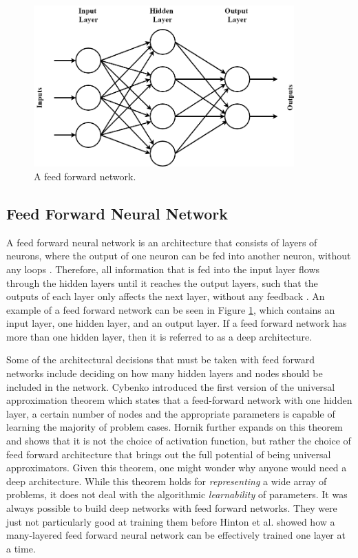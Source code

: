 \documentclass{UoYCSproject}
\begin{document}
\begin{figure}[h]
\includegraphics[width=10cm]{feedforward.png}
\centering
\caption{A feed forward network.} 
\label{fig:feedforward}
\end{figure}

\subsection{Feed Forward Neural Network}
A feed forward neural network is an architecture that consists of layers of neurons, where the output of one neuron can be fed into another neuron, without any loops \cite{jain1996artificial}. Therefore, all information that is fed into the input layer flows through the hidden layers until it reaches the output layers, such that the outputs of each layer only affects the next layer, without any feedback \cite{jhaartificial}. An example of a feed forward network can be seen in Figure \ref{fig:feedforward}, which contains an input layer, one hidden layer, and an output layer. If a feed forward network has more than one hidden layer, then it is referred to as a deep architecture. 

Some of the architectural decisions that must be taken with feed forward networks include deciding on how many hidden layers and nodes should be included in the network. Cybenko \cite{cybenko1989approximation} introduced the first version of the universal approximation theorem which states that a feed-forward network with one hidden layer, a certain number of nodes and the appropriate parameters is capable of learning the majority of problem cases. Hornik \cite{hornik1991approximation} further expands on this theorem and shows that it is not the choice of activation function, but rather the choice of feed forward architecture that brings out the full potential of being universal approximators. Given this theorem, one might wonder why anyone would need a deep architecture. While this theorem holds for \textit{representing} a wide array of problems, it does not deal with the algorithmic \textit{learnability} of parameters. It was always possible to build deep networks with feed forward networks. They were just not particularly good at training them before Hinton et al. \cite{hinton2006fast} showed how a many-layered feed forward neural network can be effectively trained one layer at a time. 
\end{document}
